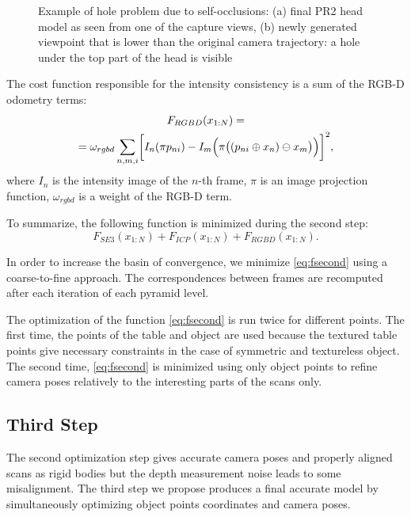 \documentclass[letterpaper, 10 pt, conference]{ieeeconf}  %
\begin{document}
\begin{figure}[t]
\begin{subfigure}[b]{0.45\linewidth}
                \caption{}
        \end{subfigure}
        \caption{Example of hole problem due to self-occlusions:
        (a) final PR2 head model as seen from one of the capture views,
        (b) newly generated viewpoint that is lower than the original camera trajectory: a hole under 
        the top part of the head is visible}
        \label{fig:pr2}
\end{figure}

The cost function responsible for the intensity consistency is
a sum of the RGB-D odometry terms:
\begin{multline} \label{eq:frgbd}
F_{RGBD}(x_{1:N}) = \\
= \omega_{rgbd} \sum_{n,m,i} \biggl[I_n(\pi p_{ni}) - I_m\Bigl(\pi \bigl((p_{ni} \oplus x_n) \ominus x_m\bigr)\Bigr) \biggr]^2,
\end{multline}
where $I_n$ is the intensity image of the $n$-th frame, $\pi$ is an image projection function, $\omega_{rgbd}$
is a weight of the RGB-D term.

To summarize, the following function is minimized during the second step:
\begin{equation} \label{eq:fsecond}
F_{SE3}(x_{1:N}) + F_{ICP}(x_{1:N}) + F_{RGBD}(x_{1:N}).
\end{equation}

In order to increase the basin of convergence,
we minimize \eqref{eq:fsecond} using a coarse-to-fine approach.
The correspondences between frames are recomputed
after each iteration of each pyramid level.

The optimization of the function \eqref{eq:fsecond} is run 
twice for different points. The first time, the points of the table and object are used because 
the textured table points give necessary constraints in the case of symmetric and textureless object.
The second time, \eqref{eq:fsecond} is minimized using only object points to refine 
camera poses relatively to the interesting parts of the scans only.

\subsection{Third Step}

The second optimization step gives accurate camera poses and properly aligned scans
as rigid bodies but the depth measurement noise leads to some misalignment. The third step we propose produces a 
final accurate model by
simultaneously optimizing object points coordinates and camera poses.
\end{document}
